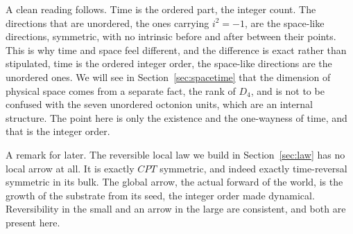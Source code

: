 A clean reading follows. Time is the ordered part, the integer count. The directions that are unordered, the ones
carrying $i^2 = -1$, are the space-like directions, symmetric, with no intrinsic before and after between their
points. This is why time and space feel different, and the difference is exact rather than stipulated, time is the
ordered integer order, the space-like directions are the unordered ones. We will see in Section~\ref{sec:spacetime}
that the dimension of physical space comes from a separate fact, the rank of $D_4$, and is not to be confused with the
seven unordered octonion units, which are an internal structure. The point here is only the existence and the
one-wayness of time, and that is the integer order.

A remark for later. The reversible local law we build in Section~\ref{sec:law} has no local arrow at all. It is
exactly $CPT$ symmetric, and indeed exactly time-reversal symmetric in its bulk. The global arrow, the actual
forward of the world, is the growth of the substrate from its seed, the integer order made dynamical. Reversibility in
the small and an arrow in the large are consistent, and both are present here.
